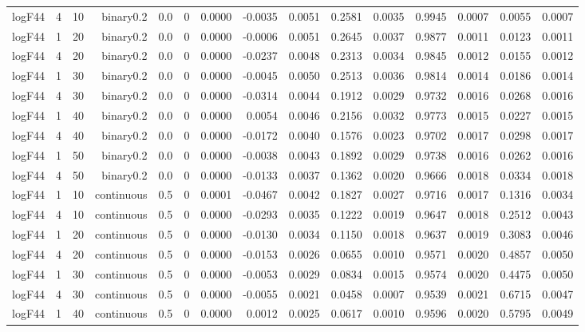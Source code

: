 \begin{longtable}{rrrrrrrrrrrrrrr}
  logF44 & 4 & 10 & binary0.2 & 0.0 & 0 & 0.0000 & -0.0035 & 0.0051 & 0.2581 & 0.0035 & 0.9945 & 0.0007 & 0.0055 & 0.0007 \\ 
  logF44 & 1 & 20 & binary0.2 & 0.0 & 0 & 0.0000 & -0.0006 & 0.0051 & 0.2645 & 0.0037 & 0.9877 & 0.0011 & 0.0123 & 0.0011 \\ 
  logF44 & 4 & 20 & binary0.2 & 0.0 & 0 & 0.0000 & -0.0237 & 0.0048 & 0.2313 & 0.0034 & 0.9845 & 0.0012 & 0.0155 & 0.0012 \\ 
  logF44 & 1 & 30 & binary0.2 & 0.0 & 0 & 0.0000 & -0.0045 & 0.0050 & 0.2513 & 0.0036 & 0.9814 & 0.0014 & 0.0186 & 0.0014 \\ 
  logF44 & 4 & 30 & binary0.2 & 0.0 & 0 & 0.0000 & -0.0314 & 0.0044 & 0.1912 & 0.0029 & 0.9732 & 0.0016 & 0.0268 & 0.0016 \\ 
  logF44 & 1 & 40 & binary0.2 & 0.0 & 0 & 0.0000 & 0.0054 & 0.0046 & 0.2156 & 0.0032 & 0.9773 & 0.0015 & 0.0227 & 0.0015 \\ 
  logF44 & 4 & 40 & binary0.2 & 0.0 & 0 & 0.0000 & -0.0172 & 0.0040 & 0.1576 & 0.0023 & 0.9702 & 0.0017 & 0.0298 & 0.0017 \\ 
  logF44 & 1 & 50 & binary0.2 & 0.0 & 0 & 0.0000 & -0.0038 & 0.0043 & 0.1892 & 0.0029 & 0.9738 & 0.0016 & 0.0262 & 0.0016 \\ 
  logF44 & 4 & 50 & binary0.2 & 0.0 & 0 & 0.0000 & -0.0133 & 0.0037 & 0.1362 & 0.0020 & 0.9666 & 0.0018 & 0.0334 & 0.0018 \\ 
  logF44 & 1 & 10 & continuous & 0.5 & 0 & 0.0001 & -0.0467 & 0.0042 & 0.1827 & 0.0027 & 0.9716 & 0.0017 & 0.1316 & 0.0034 \\ 
  logF44 & 4 & 10 & continuous & 0.5 & 0 & 0.0000 & -0.0293 & 0.0035 & 0.1222 & 0.0019 & 0.9647 & 0.0018 & 0.2512 & 0.0043 \\ 
  logF44 & 1 & 20 & continuous & 0.5 & 0 & 0.0000 & -0.0130 & 0.0034 & 0.1150 & 0.0018 & 0.9637 & 0.0019 & 0.3083 & 0.0046 \\ 
  logF44 & 4 & 20 & continuous & 0.5 & 0 & 0.0000 & -0.0153 & 0.0026 & 0.0655 & 0.0010 & 0.9571 & 0.0020 & 0.4857 & 0.0050 \\ 
  logF44 & 1 & 30 & continuous & 0.5 & 0 & 0.0000 & -0.0053 & 0.0029 & 0.0834 & 0.0015 & 0.9574 & 0.0020 & 0.4475 & 0.0050 \\ 
  logF44 & 4 & 30 & continuous & 0.5 & 0 & 0.0000 & -0.0055 & 0.0021 & 0.0458 & 0.0007 & 0.9539 & 0.0021 & 0.6715 & 0.0047 \\ 
  logF44 & 1 & 40 & continuous & 0.5 & 0 & 0.0000 & 0.0012 & 0.0025 & 0.0617 & 0.0010 & 0.9596 & 0.0020 & 0.5795 & 0.0049 \\ 

\end{longtable}
